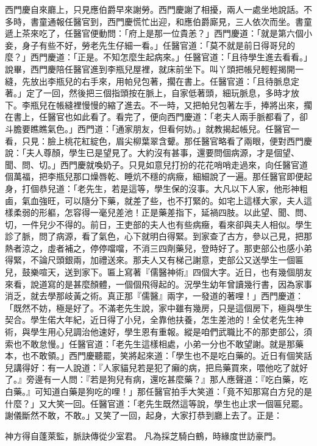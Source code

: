西門慶自來廳上，只見應伯爵早來謝勞。西門慶謝了相擾，兩人一處坐地說話。不多時，書童通報任醫官到，西門慶慌忙出迎，和應伯爵廝見，三人依次而坐。書童遞上茶來吃了，任醫官便動問：「府上是那一位貴恙？」西門慶道：「就是第六個小妾，身子有些不好，勞老先生仔細一看。」任醫官道：「莫不就是前日得哥兒的麼？」西門慶道：「正是。不知怎麼生起病來。」任醫官道：「且待學生進去看看。」說畢，西門慶陪任醫官進到李瓶兒屋裡，就床前坐下。叫丫頭把帳兒輕輕揭開一縫，先放出李瓶兒的右手來，用帕兒包著，擱在書上。任醫官道：「且待脈息定著。」定了一回，然後把三個指頭按在脈上，自家低著頭，細玩脈息，多時才放下。李瓶兒在帳縫裡慢慢的縮了進去。不一時，又把帕兒包著左手，捧將出來，擱在書上，任醫官也如此看了。看完了，便向西門慶道：「老夫人兩手脈都看了，卻斗膽要瞧瞧氣色。」西門道：「通家朋友，但看何妨。」就教揭起帳兒。任醫官一看，只見：臉上桃花紅綻色，眉尖柳葉翠含顰。那任醫官略看了兩眼，便對西門慶說：「夫人尊顏，學生已是望見了。大約沒有甚事，還要問個病源，才是個望、聞、問、切。」西門慶就喚奶子。只見如意兒打扮的花花哨哨走過來，向任醫官道個萬福，把李瓶兒那口燥唇乾、睡炕不穩的病癥，細細說了一遍。那任醫官即便起身，打個恭兒道：「老先生，若是這等，學生保的沒事。大凡以下人家，他形神粗鹵，氣血強旺，可以隨分下藥，就差了些，也不打緊的。如宅上這樣大家，夫人這樣柔弱的形軀，怎容得一毫兒差池！正是藥差指下，延禍四肢。以此望、聞、問、切，一件兒少不得的。前日，王吏部的夫人也有些病癥，看來卻與夫人相似。學生診了脈，問了病源，看了氣色，心下就明白得緊。到家查了古方，參以己見，把那熱者涼之，虛者補之，停停噹噹，不消三四劑藥兒，登時好了。那吏部公也感小弟得緊，不論尺頭銀兩，加禮送來。那夫人又有梯己謝意，吏部公又送學生一個匾兒，鼓樂喧天，送到家下。匾上寫著『儒醫神術』四個大字。近日，也有幾個朋友來看，說道寫的是甚麼顏體，一個個飛得起的。況學生幼年曾讀幾行書，因為家事消乏，就去學那岐黃之術。真正那『儒醫』兩字，一發道的著哩！」西門慶道：「既然不妨，極是好了。不滿老先生說，家中雖有幾房，只是這個房下，極與學生契合。學生偌大年紀，近日得了小兒，全靠他扶養，怎生差池的！全仗老先生神術，與學生用心兒調治他速好，學生恩有重報。縱是咱們武職比不的那吏部公，須索也不敢怠慢。」任醫官道：「老先生這樣相處，小弟一分也不敢望謝。就是那藥本，也不敢領。」西門慶聽罷，笑將起來道：「學生也不是吃白藥的。近日有個笑話兒講得好：有一人說道：『人家貓兒若是犯了癩的病，把烏藥買來，喂他吃了就好了。』旁邊有一人問：『若是狗兒有病，還吃甚麼藥？』那人應聲道：『吃白藥，吃白藥。』可知道白藥是狗吃的哩！」那任醫官拍手大笑道：「竟不知那寫白方兒的是什麼？」又大笑一回。任醫官道：「老先生既然這等說，學生也止求一個匾兒罷。謝儀斷然不敢，不敢。」又笑了一回，起身，大家打恭到廳上去了。正是：

神方得自蓬萊監，脈訣傳從少室君。
凡為採芝騎白鶴，時緣度世訪豪門。

